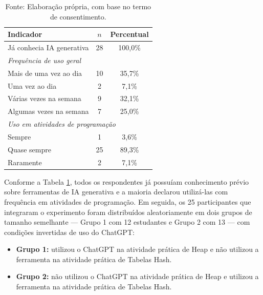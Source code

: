 \begin{table}[!ht]
    \centering
    \caption{Perfil dos participantes quanto ao uso de IA generativa ($n = 28$, formulário inicial)}
    \label{tab:perfil-ia}
    \begin{tabular}{l c c}
        \hline
        \textbf{Indicador} & \textbf{$n$} & \textbf{Percentual} \\
        \hline
        Já conhecia IA generativa & 28 & 100,0\% \\
        \hline
        \multicolumn{3}{l}{\textit{Frequência de uso geral}} \\
        Mais de uma vez ao dia & 10 & 35,7\% \\
        Uma vez ao dia & 2 & 7,1\% \\
        Várias vezes na semana & 9 & 32,1\% \\
        Algumas vezes na semana & 7 & 25,0\% \\
        \hline
        \multicolumn{3}{l}{\textit{Uso em atividades de programação}} \\
        Sempre & 1 & 3,6\% \\
        Quase sempre & 25 & 89,3\% \\
        Raramente & 2 & 7,1\% \\
        \hline
    \end{tabular}

    \vspace{0.2cm}
    \caption*{Fonte: Elaboração própria, com base no termo de consentimento.}
\end{table}

Conforme a Tabela \ref{tab:perfil-ia}, todos os respondentes já possuíam conhecimento prévio sobre ferramentas de IA generativa e a maioria declarou utilizá-las com frequência em atividades de programação. Em seguida, os 25 participantes que integraram o experimento foram distribuídos aleatoriamente em dois grupos de tamanho semelhante --- Grupo 1 com 12 estudantes e Grupo 2 com 13 --- com condições invertidas de uso do ChatGPT:

\begin{itemize}
    \item \textbf{Grupo 1:} utilizou o ChatGPT na atividade prática de Heap e não utilizou a ferramenta na atividade prática de Tabelas Hash.
    \item \textbf{Grupo 2:} não utilizou o ChatGPT na atividade prática de Heap e utilizou a ferramenta na atividade prática de Tabelas Hash.
\end{itemize}

